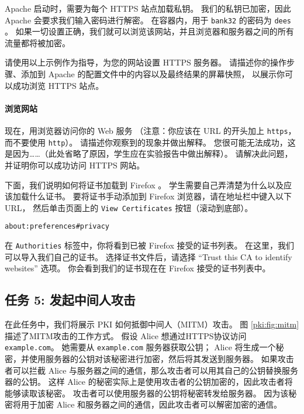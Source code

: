Apache 启动时，需要为每个 HTTPS 站点加载私钥。
我们的私钥已加密，因此 Apache 会要求我们输入密码进行解密。
在容器内，用于 \texttt{bank32} 的密码为 \texttt{dees} 。
如果一切设置正确，我们就可以浏览该网站，并且浏览器和服务器之间的所有流量都将被加密。

请使用以上示例作为指导，为您的网站设置 HTTPS 服务器。
请描述你的操作步骤、添加到 Apache 的配置文件中的内容以及最终结果的屏幕快照，
以展示你可以成功浏览 HTTPS 站点。

\paragraph{浏览网站}
现在，用浏览器访问你的 Web 服务
（注意：你应该在 URL 的开头加上 \texttt{https}，而不要使用 \texttt{http}）。
请描述你观察到的现象并做出解释。
您很可能无法成功，这是因为……（此处省略了原因，学生应在实验报告中做出解释）。
请解决此问题，并证明你可以成功访问 HTTPS 网站。

下面，我们说明如何将证书加载到 Firefox 。
学生需要自己弄清楚为什么以及应该加载什么证书。
要将证书手动添加到 Firefox 浏览器，请在地址栏中键入以下URL，
然后单击页面上的 \texttt{View Certificates} 按钮（滚动到底部）。

\begin{lstlisting}
about:preferences#privacy
\end{lstlisting}

在 \texttt{Authorities} 标签中，你将看到已被 Firefox 接受的证书列表。
在这里，我们可以导入我们自己的证书。
选择证书文件后，请选择 ``Trust this CA to identify websites'' 选项。
你会看到我们的证书现在在 Firefox 接受的证书列表中。



\subsection{任务 5: 发起中间人攻击}

在此任务中，我们将展示 PKI 如何抵御中间人（MITM）攻击。
图 \ref{pki:fig:mitm} 描述了MITM攻击的工作方式。
假设 Alice 想通过HTTPS协议访问 \texttt{example.com}。
她需要从 \texttt{example.com} 服务器获取公钥；
Alice 将生成一个秘密，并使用服务器的公钥对该秘密进行加密，然后将其发送到服务器。
如果攻击者可以拦截 Alice 与服务器之间的通信，那么攻击者可以用其自己的公钥替换服务器的公钥。
这样 Alice 的秘密实际上是使用攻击者的公钥加密的，因此攻击者将能够读取该秘密。
攻击者可以使用服务器的公钥将秘密转发给服务器。
因为该秘密将用于加密 Alice 和服务器之间的通信，因此攻击者可以解密加密的通信。


